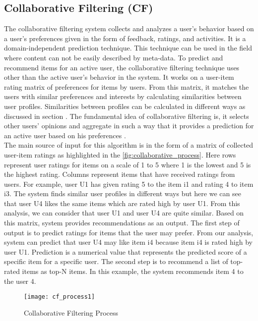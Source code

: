 \subsection{Collaborative Filtering (CF)}
The collaborative filtering system collects and analyzes a user's behavior based on a user's preferences given in the form of feedback, ratings, and activities. It is a domain-independent prediction technique. This technique can be used in the field where content can not be easily described by meta-data. To predict and recommend items for an active user, the collaborative filtering technique uses other than the active user's behavior in the system. It works on a user-item rating matrix of preferences for items by users. From this matrix, it matches the users with similar preferences and interests by calculating similarities between user profiles. Similarities between profiles can be calculated in different ways as discussed in section . The fundamental idea of collaborative filtering is, it selects other users' opinions and aggregate in such a way that it provides a prediction for an active user based on his preferences \cite{7}.\\
The main source of input for this algorithm is in the form of a matrix of collected user-item ratings as highlighted in the \autoref{fig:collaborative_process}. Here rows represent user ratings for items on a scale of 1 to 5 where 1 is the lowest and 5 is the highest rating. Columns represent items that have received ratings from users. For example, user U1 has given rating 5 to the item i1 and rating 4 to item i3. The system finds similar user profiles in different ways but here we can see that user U4 likes the same items which are rated high by user U1. From this analysis, we can consider that user U1 and user U4 are quite similar. Based on this matrix, system provides recommendations as an output. The first step of output is to predict ratings for items that the user may prefer. From our analysis, system can predict that user U4 may like item i4 because item i4 is rated high by user U1. Prediction is a numerical value that represents the predicted score of a specific item for a specific user. The second step is to recommend a list of top-rated items as top-N items. In this example, the system recommends item 4 to the user 4.
\\
\begin{figure}[H]
	\centering
	\texttt{[image: cf\_process1]}
	\caption{Collaborative Filtering Process \cite{33}}
	\label{fig:collaborative_process}
\end{figure}


